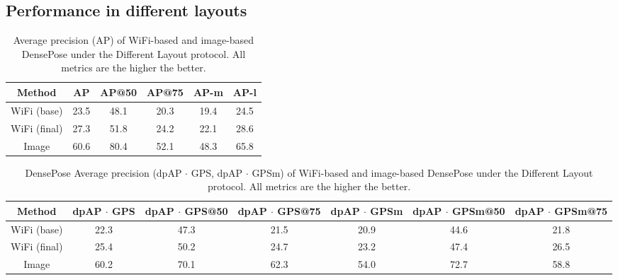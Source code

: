 \documentclass[sigconf, anonymous=false]{acmart}
\begin{document}

\subsection{Performance in different layouts}

\begin{table*}[!htb]
\begin{center}
\begin{tabular}{ |c|c|c|c|c|c| } 
 \hline
 Method & AP & AP@50 & AP@75 & AP-m & AP-l \\
 \hline
 WiFi (base) & 23.5 & 48.1 & 20.3 & 19.4 & 24.5\\
 \hline
 WiFi (final) & 27.3 & 51.8 & 24.2 & 22.1 & 28.6\\
 \hline
 Image & 60.6 & 80.4 & 52.1 & 48.3 & 65.8\\ 
 \hline
\end{tabular}
\end{center}
\caption{Average precision (AP) of WiFi-based and image-based DensePose under the Different Layout protocol. All metrics are the higher the better.}
\label{tab:different_1}
\end{table*}


\begin{table*}[!htb]
\begin{center}
\begin{tabular}{ |c|c|c|c|c|c|c| } 
 \hline
 Method & dpAP $\cdot$ GPS & dpAP $\cdot$ GPS@50 & dpAP $\cdot$ GPS@75 & dpAP $\cdot$ GPSm & dpAP $\cdot$ GPSm@50 & dpAP $\cdot$ GPSm@75 \\
  \hline
 WiFi (base) &  22.3 & 47.3 & 21.5 & 20.9 & 44.6 & 21.8\\
 \hline
 WiFi (final) &  25.4 & 50.2 & 24.7 & 23.2 & 47.4 & 26.5\\ \hline
 Image & 60.2 & 70.1 & 62.3 & 54.0 & 72.7 & 58.8\\
 \hline
\end{tabular}
\end{center}
\caption{DensePose Average precision (dpAP $\cdot$ GPS, dpAP $\cdot$ GPSm) of WiFi-based and image-based DensePose under the Different Layout protocol. All metrics are the higher the better.}
\label{tab:different_2}
\end{table*}
\end{document}
